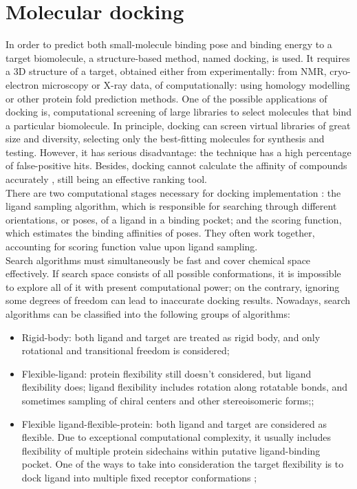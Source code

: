 \section{Molecular docking}
    In order to predict both small-molecule binding pose and binding energy to a target biomolecule, a structure-based method, named docking, is used.
    It requires a 3D structure of a target, obtained either from experimentally: from NMR, cryo-electron microscopy or X-ray data, of computationally: using homology modelling or other protein fold prediction methods.
    One of the possible applications of docking is, computational screening of large libraries to select molecules that bind a particular biomolecule.
  In principle, docking can screen virtual libraries of great size and diversity, selecting only the best-fitting molecules for synthesis and testing. 
  However, it has serious disadvantage: the technique has a high percentage of false-positive hits. 
  Besides, docking cannot calculate the affinity of compounds accurately {\cite{Lyu2019Ultra-largeChemotypes}}, still being an effective ranking tool.\\
  
  There are two computational stages necessary for docking implementation {\cite{Du2016InsightsMethods}}: the ligand sampling algorithm, which is responsible for searching through different orientations, or poses, of a ligand in a binding pocket; and the scoring function, which estimates the binding affinities of poses. They often work together, accounting for scoring function value upon ligand sampling.\\
  
  Search algorithms must simultaneously be fast and cover chemical space effectively.
  If search space consists of all possible conformations, it is impossible to explore all of it with present computational power; on the contrary, ignoring some degrees of freedom can lead to inaccurate docking results.
  Nowadays, search algorithms can be classified into the following groups of algorithms:
  \begin{itemize}
      \item 
      Rigid-body: both ligand and target are treated as rigid body, and only rotational and transitional freedom is considered;
      \item Flexible-ligand: protein flexibility still doesn't considered, but ligand flexibility does; ligand flexibility includes rotation along rotatable bonds, and sometimes sampling of chiral centers and other stereoisomeric forms;;
      \item Flexible ligand-flexible-protein: both ligand and target are considered as flexible. Due to exceptional computational complexity, it usually includes flexibility of multiple protein sidechains within putative ligand-binding pocket. One of the ways to take into consideration the target flexibility is to dock ligand into multiple fixed receptor conformations \cite{Totrov2008FlexibleAlternative};
  \end{itemize}
  
